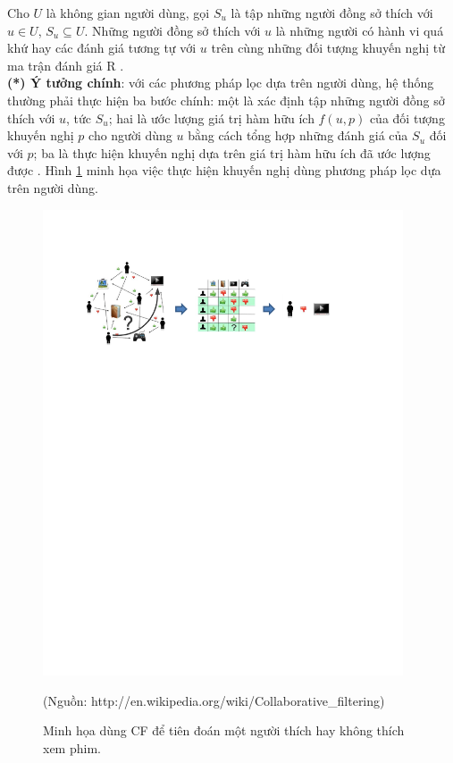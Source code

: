 Cho $U$ là không gian người dùng, gọi $S_{u}$ là tập những người đồng sở thích với $u \in U$, $S_{u} \subseteq U$. Những người đồng sở thích với $u$ là những người có hành vi quá khứ hay các đánh giá tương tự với $u$ trên cùng những đối tượng khuyến nghị từ ma trận đánh giá R \cite{Breese:1998:EAP:2074094.2074100, Su:2009:SCF, Jannach:2010:RSI}.
\\\textbf{(*) Ý tưởng chính}: với các phương pháp lọc dựa trên người dùng, hệ thống thường phải thực hiện ba bước chính: một là xác định tập những người đồng sở thích với $u$, tức $S_{u}$; hai là ước lượng giá trị hàm hữu ích $f(u,p)$ của đối tượng khuyến nghị $p$ cho người dùng $u$ bằng cách tổng hợp những đánh giá của $S_{u}$ đối với $p$; ba là thực hiện khuyến nghị dựa trên giá trị hàm hữu ích đã ước lượng được \cite{Jannach:2010:RSI, Su:2009:SCF}. Hình \ref{fig:figure_1_2} minh họa việc thực hiện khuyến nghị dùng phương pháp lọc dựa trên người dùng.
\begin{figure}[ht]
\begin{center}
\advance\leftskip-3cm
\advance\rightskip-3cm
  \includegraphics[width=0.95\textwidth]{Figure_1_2.pdf}
  \caption{Minh họa dùng CF để tiên đoán một người thích hay không thích xem phim.}\label{fig:figure_1_2} (Nguồn: http://en.wikipedia.org/wiki/Collaborative\_filtering)
\end{center}  
\end{figure}
